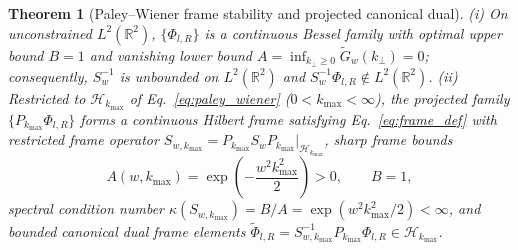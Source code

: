 \documentclass[aps,pra,onecolumn,notitlepage,11pt,tightenlines,amsmath,amssymb,floatfix,longbibliography]{revtex4-2}
\newtheorem{theorem}{Theorem}
\begin{document}
\begin{theorem}[Paley--Wiener frame stability and projected canonical dual]
\label{thm:pw_bounds}
(i) On unconstrained $L^2(\mathbb{R}^2)$, $\{\Phi_{l,R}\}$ is a continuous Bessel family with optimal upper bound $B = 1$ and vanishing lower bound $A = \inf_{k_\perp \ge 0} \widetilde{G}_w(k_\perp) = 0$; consequently, $S_w^{-1}$ is unbounded on $L^2(\mathbb{R}^2)$ and $S_w^{-1}\Phi_{l,R} \notin L^2(\mathbb{R}^2)$. (ii) Restricted to $\mathcal{H}_{k_{\max}}$ of Eq.~\eqref{eq:paley_wiener} ($0 < k_{\max} < \infty$), the projected family $\{P_{k_{\max}}\Phi_{l,R}\}$ forms a continuous Hilbert frame satisfying Eq.~\eqref{eq:frame_def} with restricted frame operator $S_{w,k_{\max}} = P_{k_{\max}} S_w P_{k_{\max}}\big|_{\mathcal{H}_{k_{\max}}}$, sharp frame bounds
\begin{equation}
A(w, k_{\max}) = \exp\!\left(-\frac{w^2 k_{\max}^2}{2}\right) > 0, \qquad B = 1,
\label{eq:optimal_bounds}
\end{equation}
spectral condition number $\kappa(S_{w,k_{\max}}) = B/A = \exp(w^2 k_{\max}^2/2) < \infty$, and bounded canonical dual frame elements $\widetilde{\Phi}_{l,R} = S_{w,k_{\max}}^{-1} P_{k_{\max}}\Phi_{l,R} \in \mathcal{H}_{k_{\max}}$.
\end{theorem}
\end{document}
